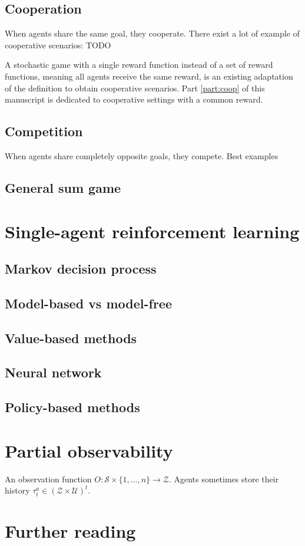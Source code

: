 \subsection{Cooperation} 
\label{sec:ch2_Cooperation}
When agents share the same goal, they cooperate.
There exist a lot of example of cooperative scenarios: TODO

A stochastic game with a single reward function instead of a set of reward functions, meaning all agents receive the same reward, is an existing adaptation of the definition to obtain cooperative scenarios.
Part \ref{part:coop} of this manuscript is dedicated to cooperative settings with a common reward.

\subsection{Competition} 
\label{sec:ch2_Competition}
When agents share completely opposite goals, they compete.
Best examples 

\subsection{General sum game} 
\label{sec:ch2_general_sum_game}

\section{Single-agent reinforcement learning} 
\label{sec:ch2_single_agent_RL}
\subsection{Markov decision process} \label{sec:ch2_mdp}

\subsection{Model-based vs model-free} \label{sec:ch2_model_based_vs_model_free}
\subsection{Value-based methods} \label{sec:ch2_value_based_methods}
\subsection{Neural network} \label{sec:ch2_neural_network}
\subsection{Policy-based methods} \label{sec:ch2_policy_based_methods}
\section{Partial observability} \label{sec:ch2_partial_observability}
An observation function $O:\mathcal{S} \times \{1,...,n\} \rightarrow \mathcal{Z}$.
Agents sometimes store their history $\tau^a_t \in (\mathcal{Z} \times \mathcal{U})^t$.

\section{Further reading} \label{sec:ch2_futher}
